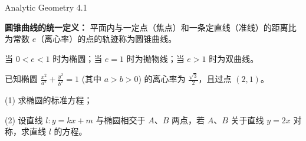 \documentclass{ctexart}
\begin{document}
\thispagestyle{fancy}

\begin{center}
    \begin{chaptertitle}{\faBookOpen}{Analytic Geometry 4.1}
    \end{chaptertitle}
\end{center}


\begin{theorembox}{4.1}
\textbf{圆锥曲线的统一定义：} 平面内与一定点（焦点）和一条定直线（准线）的距离比为常数 $e$（离心率）的点的轨迹称为圆锥曲线。

当 $0 < e < 1$ 时为椭圆；当 $e = 1$ 时为抛物线；当 $e > 1$ 时为双曲线。
\end{theorembox}

\begin{examplebox}{4.1}
已知椭圆 $\frac{x^2}{a^2} + \frac{y^2}{b^2} = 1$ (其中 $a > b > 0$) 的离心率为 $\frac{\sqrt{3}}{2}$，且过点 $(2, 1)$。

(1) 求椭圆的标准方程；

(2) 设直线 $l: y = kx + m$ 与椭圆相交于 $A$、$B$ 两点，若 $A$、$B$ 关于直线 $y = 2x$ 对称，求直线 $l$ 的方程。
\end{examplebox}
\end{document}
